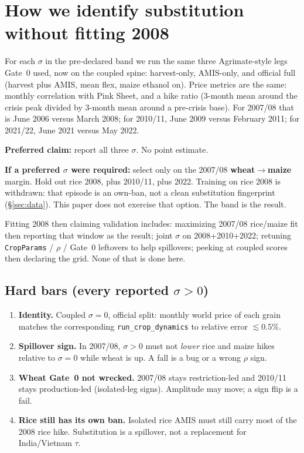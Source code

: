 \documentclass[11pt,a4paper]{article}
\begin{document}


\section{How we identify substitution without fitting 2008}
\label{sec:ident}

For each \(\sigma\) in the pre-declared band we run the same three
Agrimate-style legs Gate~0 used, now on the coupled spine: harvest-only,
AMIS-only, and official full (harvest plus AMIS, mean flex, maize ethanol
on). Price metrics are the same: monthly correlation with Pink Sheet, and
a hike ratio (3-month mean around the crisis peak divided by 3-month mean
around a pre-crisis base). For 2007/08 that is June 2006 versus March
2008; for 2010/11, June 2009 versus February 2011; for 2021/22, June 2021
versus May 2022.

\textbf{Preferred claim:} report all three \(\sigma\). No point estimate.

\textbf{If a preferred \(\sigma\) were required:} select only on the
2007/08 \textbf{wheat\(\to\)maize} margin. Hold out rice 2008, plus
2010/11, plus 2022. Training on rice 2008 is withdrawn: that episode is an
own-ban, not a clean substitution fingerprint (\S\ref{sec:data}). This
paper does not exercise that option. The band is the result.

Fitting 2008 then claiming validation includes: maximizing 2007/08
rice/maize fit then reporting that window as the result; joint \(\sigma\)
on 2008+2010+2022; retuning \texttt{CropParams} / \(\rho\) / Gate~0
leftovers to help spillovers; peeking at coupled scores then declaring the
grid. None of that is done here.

\subsection{Hard bars (every reported \(\sigma>0\))}

\begin{enumerate}
\item \textbf{Identity.} Coupled \(\sigma=0\), official split: monthly
      world price of each grain matches the corresponding
      \texttt{run\_crop\_dynamics} to relative error \(\lesssim 0.5\%\).
\item \textbf{Spillover sign.} In 2007/08, \(\sigma>0\) must not
      \emph{lower} rice and maize hikes relative to \(\sigma=0\) while
      wheat is up. A fall is a bug or a wrong \(\rho\) sign.
\item \textbf{Wheat Gate~0 not wrecked.} 2007/08 stays restriction-led and
      2010/11 stays production-led (isolated-leg signs). Amplitude may
      move; a sign flip is a fail.
\item \textbf{Rice still has its own ban.} Isolated rice AMIS must still
      carry most of the 2008 rice hike. Substitution is a spillover, not a
      replacement for India/Vietnam \(\tau\).
\end{enumerate}
\end{document}
